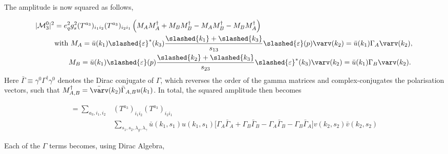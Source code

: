 The amplitude is now squared as follows,

\begin{equation}
    \begin{split}
        |\mathcal M_3^0|^2 &= e_q^2g_s^2(T^{a_3})_{i_1i_2}(T^{a_3})_{i_2i_1}\left(M_AM_A^\dagger+M_BM_B^\dagger-M_AM_B^\dagger-M_BM_A^\dagger\right)\\
                           &\text{with } M_A = \bar u(k_1) \slashed{\varepsilon}^*(k_3)\frac{\slashed{k_1}+\slashed{k_3}}{s_{13}}\slashed{\varepsilon}(p)\varv(k_2)= \bar u(k_1) \Gamma_A\varv(k_2),\\
                           &\,\,\,\,\,\,\,\,\,\,\,\, M_B = \bar u(k_1) \slashed{\varepsilon}(p)\frac{\slashed{k_2}+\slashed{k_3}}{s_{23}}\slashed{\varepsilon}^*(k_3)\varv(k_2) = \bar u(k_1) \Gamma_B\varv(k_2).
    \end{split}
\end{equation}
Here $\bar\Gamma\equiv\gamma^0\Gamma^\dagger\gamma^0$ denotes the Dirac conjugate of $\Gamma$, which reverses the order of the
gamma matrices and complex-conjugates the polarisation vectors, such that $M_{A,B}^\dagger=\bar\varv(k_2)\bar\Gamma_{A,B}u(k_1)$.
In total, the squared amplitude then becomes

\begin{equation}
    \begin{split}
        = \sum_{a_3,i_1,i_2} &(T^{a_3})_{i_1i_2}(T^{a_3})_{i_2i_1}\\
                             &\sum_{s_1, s_2, \lambda_g, \lambda_\gamma}\bar u(k_1,s_1) u(k_1,s_1)\Bigg[\Gamma_A \bar\Gamma_A + \Gamma_B\bar\Gamma_B - \Gamma_A\bar\Gamma_B - \Gamma_B\bar\Gamma_A\Bigg]v(k_2,s_2)\bar v(k_2,s_2)
    \end{split}
\end{equation}

Each of the $\Gamma$ terms becomes, using Dirac Algebra,

